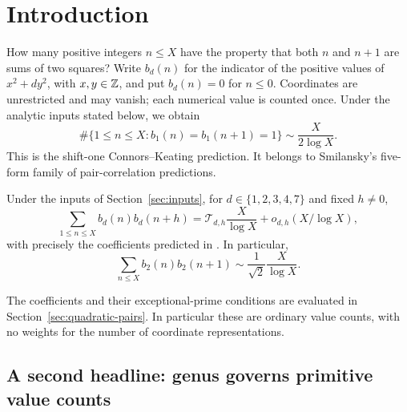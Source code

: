 \section{Introduction}
How many positive integers \(n\le X\) have the property that both
\(n\) and \(n+1\) are sums of two squares? Write \(b_d(n)\) for
the indicator of the positive values of \(x^2+dy^2\), with
\(x,y\in\mathbb Z\), and put \(b_d(n)=0\) for \(n\le0\).
Coordinates are unrestricted and may vanish; each numerical value
is counted once. Under the analytic inputs stated below, we obtain
\begin{equation}\label{eq:ck-headline}
 \#\{1\le n\le X:b_1(n)=b_1(n+1)=1\}
                         \sim\frac{X}{2\log X}.
\end{equation}
This is the shift-one Connors--Keating prediction. It belongs to
Smilansky's five-form family of pair-correlation predictions.

\begin{corollary}\label{cor:smilansky-five-pairs}
Under the inputs of Section~\ref{sec:inputs}, for
\(d\in\{1,2,3,4,7\}\) and fixed \(h\ne0\),
\[
 \sum_{1\le n\le X}b_d(n)b_d(n+h)
       =\mathscr T_{d,h}\frac X{\log X}+o_{d,h}(X/\log X),
\]
with precisely the coefficients predicted in
\cite[Section 6.3, equations (6.2)--(6.4)]{smilansky}.
In particular,
\begin{equation}\label{eq:minus-eight-shift-one}
 \sum_{n\le X}b_2(n)b_2(n+1)
                       \sim\frac1{\sqrt2}\frac X{\log X}.
\end{equation}
\end{corollary}

The coefficients and their exceptional-prime conditions are evaluated
in Section~\ref{sec:quadratic-pairs}. In particular these are ordinary
value counts, with no weights for the number of coordinate representations.

\subsection{A second headline: genus governs primitive value counts}

